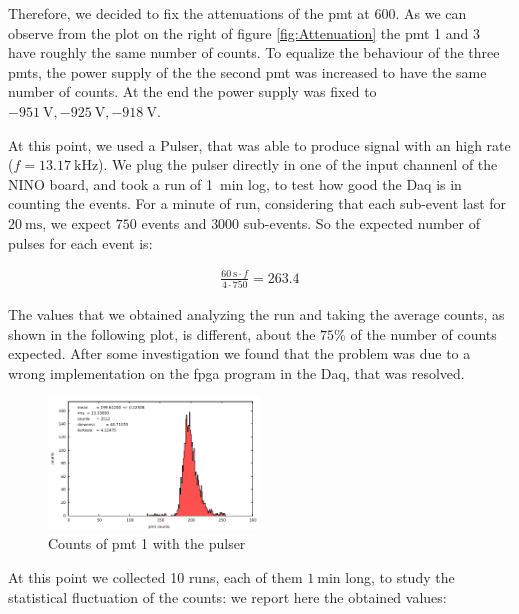 \documentclass[10pt,a4paper]{article}
\begin{document}
Therefore, we decided to fix the attenuations of the pmt at $600$. 
As we can observe from the plot on the right of figure \ref{fig:Attenuation} the pmt 1 and 3 have roughly the same number of counts. To equalize the behaviour of the three pmts, the power supply of the the second pmt was increased to have the same number of counts. At the end the power supply was fixed to $ \SI{-951}{\volt} , \SI{-925}{\volt}, \SI{-918}{\volt} $.

At this point, we used a Pulser, that was able to produce signal with an high rate ($f = \SI{13.17}{\kilo \hertz}$). We plug the pulser directly in one of the input channenl of the NINO board, and took a run of \SI{1}{\minute} log, to test how good the Daq is in counting the events. For a minute of run, considering that each sub-event last for $\SI{20}{\milli \second}$, we expect $750$ events and $3000$ sub-events. So the expected number of pulses for each event is:

\begin{align*}
\frac{\SI{60}{\second} \cdot f}{4 \cdot 750} = 263.4 
\end{align*}

The values that we obtained analyzing the run and taking the average counts, as shown in the following plot, is different, about the $75\%$ of the number of counts expected. After some investigation we found that the problem was due to a wrong implementation on the fpga program in the Daq, that was resolved. 

\begin{figure}[hbtp]
\centering
\includegraphics[width=0.5\textwidth]{figures/pmtB.pdf}
\caption{Counts of pmt 1 with the pulser}
\end{figure}

At this point we collected 10 runs, each of them $\SI{1}{\minute}$ long, to study the statistical fluctuation of  the counts: we report here the obtained values:
\end{document}
